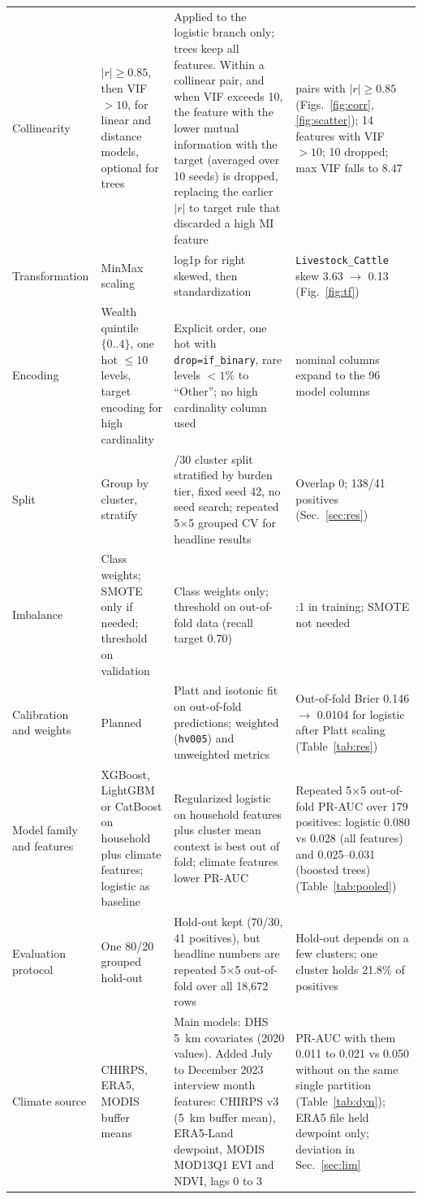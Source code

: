 \documentclass[11pt]{article}
\begin{document}
\begin{table}[t]
\begin{tabularx}{\textwidth}{>{\raggedright\arraybackslash}p{2.1cm}>{\raggedright\arraybackslash}p{3.7cm}>{\raggedright\arraybackslash}p{4.4cm}>{\raggedright\arraybackslash}X}
Collinearity & $|r|\ge0.85$, then VIF$>10$, for linear and distance models, optional for trees & Applied to the logistic branch only; trees keep all features. Within a collinear pair, and when VIF exceeds 10, the feature with the lower mutual information with the target (averaged over 10 seeds) is dropped, replacing the earlier $|r|$ to target rule that discarded a high MI feature & 19 pairs with $|r|\ge0.85$ (Figs.~\ref{fig:corr}, \ref{fig:scatter}); 14 features with VIF$>10$; 10 dropped; max VIF falls to 8.47\\
Transformation & MinMax scaling & log1p for right skewed, then standardization & \texttt{Livestock\_Cattle} skew 3.63 $\to$ 0.13 (Fig.~\ref{fig:tf})\\
Encoding & Wealth quintile $\{0..4\}$, one hot $\le10$ levels, target encoding for high cardinality & Explicit order, one hot with \texttt{drop=if\_binary}, rare levels $<1\%$ to ``Other''; no high cardinality column used & 22 nominal columns expand to the 96 model columns\\
Split & Group by cluster, stratify & 70/30 cluster split stratified by burden tier, fixed seed 42, no seed search; repeated 5$\times$5 grouped CV for headline results & Overlap 0; 138/41 positives (Sec.~\ref{sec:res})\\
Imbalance & Class weights; SMOTE only if needed; threshold on validation & Class weights only; threshold on out-of-fold data (recall target 0.70) & 93.9:1 in training; SMOTE not needed\\
Calibration and weights & Planned & Platt and isotonic fit on out-of-fold predictions; weighted (\texttt{hv005}) and unweighted metrics & Out-of-fold Brier 0.146 $\to$ 0.0104 for logistic after Platt scaling (Table~\ref{tab:res})\\
Model family and features & XGBoost, LightGBM or CatBoost on household plus climate features; logistic as baseline & Regularized logistic on household features plus cluster mean context is best out of fold; climate features lower PR-AUC & Repeated 5$\times$5 out-of-fold PR-AUC over 179 positives: logistic 0.080 vs 0.028 (all features) and 0.025--0.031 (boosted trees) (Table~\ref{tab:pooled})\\
Evaluation protocol & One 80/20 grouped hold-out & Hold-out kept (70/30, 41 positives), but headline numbers are repeated 5$\times$5 out-of-fold over all 18{,}672 rows & Hold-out depends on a few clusters; one cluster holds 21.8\% of positives\\
Climate source & CHIRPS, ERA5, MODIS buffer means & Main models: DHS 5~km covariates (2020 values). Added July to December 2023 interview month features: CHIRPS v3 (5~km buffer mean), ERA5-Land dewpoint, MODIS MOD13Q1 EVI and NDVI, lags 0 to 3 & PR-AUC with them 0.011 to 0.021 vs 0.050 without on the same single partition (Table~\ref{tab:dyn}); ERA5 file held dewpoint only; deviation in Sec.~\ref{sec:lim}\\

\end{tabularx}
\end{table}
\end{document}
